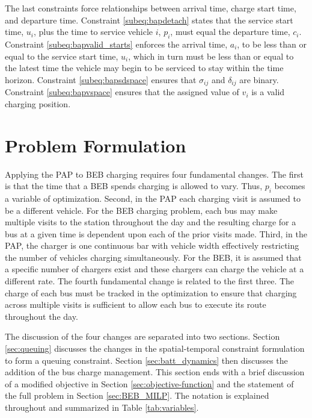 \documentclass[utf8]{FrontiersinHarvard}
\begin{document}
The last constraints force relationships between arrival time, charge start time, and departure time. Constraint
\eqref{subeq:bapdetach} states that the service start time, $u_i$, plus the time to service vehicle $i$, $p_i$, must
equal the departure time, $c_i$. Constraint \eqref{subeq:bapvalid_starts} enforces the arrival time, $a_i$, to be less
than or equal to the service start time, $u_i$, which in turn must be less than or equal to the latest time the vehicle
may begin to be serviced to stay within the time horizon. Constraint \eqref{subeq:bapsdspace} ensures that $\sigma_{ij}$ and
$\delta_{ij}$ are binary. Constraint \eqref{subeq:bapvspace} ensures that the assigned value of $v_i$ is a valid charging
position.

%
\section{Problem Formulation}
\label{sec:problemformulation}
Applying the PAP to BEB charging requires four fundamental changes. The first is that the time that a BEB spends charging is allowed to vary. Thus, $p_i$ becomes a variable of optimization. Second, in the PAP each charging visit is assumed to be a different vehicle. For the BEB charging problem, each bus may make multiple visits to the station throughout the day and the resulting charge for a bus at a given time is dependent upon each of the prior visits made. Third, in the PAP, the charger is one continuous bar with vehicle width effectively restricting the number of vehicles charging simultaneously. For the BEB, it is assumed that a specific number of chargers exist and these chargers can charge the vehicle at a different rate. The fourth fundamental change is related to the first three. The charge of each bus must be tracked in the optimization to ensure that charging across multiple visits is sufficient to allow each bus to execute its route throughout the day.



The discussion of the four changes are separated into two sections. Section \ref{sec:queuing} discusses the changes in the spatial-temporal constraint formulation to form a queuing constraint. Section \ref{sec:batt_dynamics} then discusses the addition of the bus charge management. This section ends with a brief discussion of a modified objective in Section \ref{sec:objective-function} and the statement of the full problem in Section \ref{sec:BEB_MILP}. The notation is explained throughout and summarized in Table \ref{tab:variables}.
\end{document}
